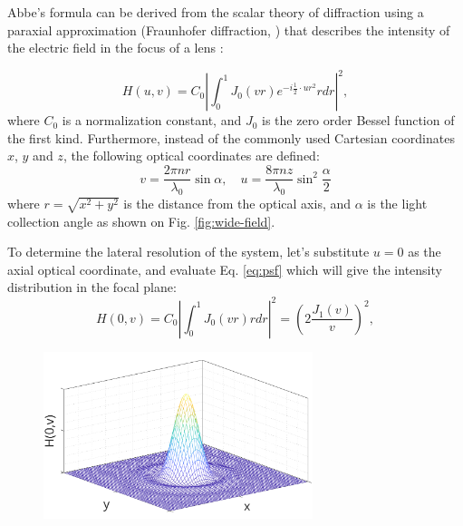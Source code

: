     Abbe's formula can be derived from the scalar theory of diffraction using a paraxial approximation (Fraunhofer diffraction, \cite{born_principles_2013}) that describes the intensity of the electric field in the focus of a lens \cite{sheppard_imaging_1987}:

    \begin{equation}
      H(u,v) = C_0 \left| \int_0^1 J_0 (vr)e^{-i\frac{1}{2}\cdot ur^2} rdr \right|^2,
      \label{eq:psf}
    \end{equation}
    where $C_0$ is a normalization constant, and $J_0$ is the zero order Bessel function of the first kind. Furthermore, instead of the commonly used Cartesian coordinates $x$, $y$ and $z$, the following optical coordinates are defined:
    \begin{equation}
      v = \frac{2\pi n  r}{\lambda_0} \sin \alpha, \quad
      u=\frac{8\pi n  z}{\lambda_0} \sin^2 \frac{\alpha}{2}
      \label{eq:substitutions}
    \end{equation}
    where $r = \sqrt{x^2 + y^2}$ is the distance from the optical axis, and $\alpha$ is the light collection angle as shown on Fig. \ref{fig:wide-field}. 

    To determine the lateral resolution of the system, let's substitute $u=0$ as the axial optical coordinate, and evaluate Eq. \ref{eq:psf} which will give the intensity distribution in the focal plane:
    \begin{equation}
      H(0,v) = C_0 \left| \int_0^1 J_0(vr)rdr \right|^2 = \left(2\frac{J_1(v)}{v} \right) ^2,
      \label{eq:airy}
    \end{equation}
    \begin{figure}
      \centering
      \includegraphics[width=0.7\textwidth]{airy}
      \label{fig:airy}
    \end{figure}



